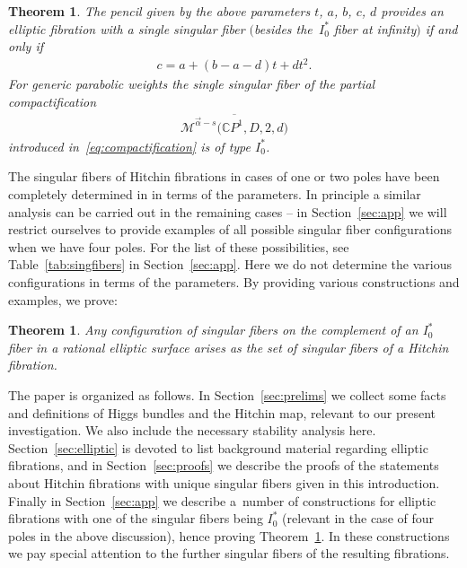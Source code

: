 \documentclass[pdftex]{sigma}
\newcommand{\CP}[1]{\mathbb{C}P^{#1}} %
\newcommand{\Mod}{{\mathcal M}} %
\numberwithin{equation}{section}
\newtheorem{thm}[prop]{Theorem}
\begin{document}
\begin{thm}\label{thm:FourPoles}The pencil given by the above parameters $t$, $a$, $b$, $c$, $d$ provides an
elliptic fibration with a single singular fiber $($besides the~$I_0^*$ fiber at infinity$)$ if and only if
\begin{gather*} c= a+(b-a-d)t+dt^2.\end{gather*} For generic parabolic weights the single singular fiber of
the partial compactification \begin{gather*} \overline{\Mod^{\vec{\alpha}-s} \big(\CP1, D, 2,d\big)}\end{gather*} introduced in~\eqref{eq:compactification} is of type $I_0^*$.
\end{thm}

The singular fibers of Hitchin fibrations in cases of one or two poles
have been completely determined in \cite{ISS, ISS2} in terms of the
parameters. In principle a similar analysis can be carried out in the
remaining cases -- in Section~\ref{sec:app} we will restrict
ourselves to provide examples of all possible singular fiber
configurations when we have four poles. For the list of these
possibilities, see Table~\ref{tab:singfibers} in
Section~\ref{sec:app}. Here we do not determine the various
configurations in terms of the parameters. By providing various
constructions and examples, we prove:

\begin{thm}\label{thm:I0*osszeseset}
Any configuration of singular fibers on the complement of an $I_0^*$ fiber
in a rational elliptic surface arises as the set of singular fibers of a
Hitchin fibration.
\end{thm}

The paper is organized as follows. In Section~\ref{sec:prelims} we collect some facts and definitions of Higgs bundles and the Hitchin
map, relevant to our present investigation. We also include the necessary stability analysis here.
Section~\ref{sec:elliptic} is devoted to list background material
regarding elliptic fibrations, and in Section~\ref{sec:proofs} we
describe the proofs of the statements about Hitchin fibrations with unique singular fibers given in this introduction.
Finally in Section~\ref{sec:app} we describe a~number of constructions for elliptic fibrations with one of the
singular fibers being $I_0^*$ (relevant in the case of four poles
in the above discussion), hence proving Theorem~\ref{thm:I0*osszeseset}. In these constructions we pay special
attention to the further singular fibers of the resulting
fibrations.
\end{document}
